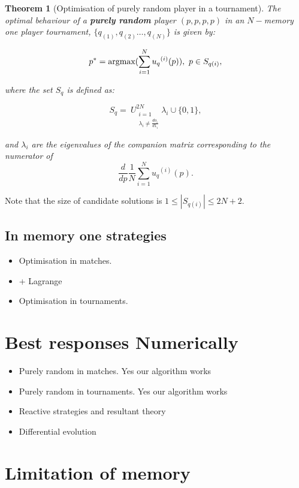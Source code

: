 \documentclass[10pt]{article}
\newtheorem{theorem}{Theorem}
\begin{document}
\begin{theorem}[Optimisation of purely random player in a tournament]
\label{theorem:random_optimisation_tournament}
    The optimal behaviour of a \textbf{purely random} player \((p, p, p, p)\)
    in an \(N-\)memory one player tournament, \(\{q_{(1)}, q_{(2)} \dots,q_{(N)} \}
    \) is given by:

    \[p^* = \textnormal{argmax}(\sum_{i=1} ^ {N} {u_q}^{(i)} (p) ), \ p \in S_{q(i)},\]

    where the set \(S_{q}\) is defined as:

    \[S_{q} = \
    U_{\substack{i=1 \\ \lambda_i \neq \frac{do_i}{d1_i}}} ^ {2N}  \lambda_i \cup \{0, 1\},\]

    and \(\lambda_i\) are the eigenvalues of the companion matrix corresponding to the
    numerator of \[\frac{d}{dp} \frac{1}{N} \sum_{i=1} ^ {N} {u_q}^{(i)} (p).\]
\end{theorem}

Note that the size of candidate solutions is \( 1 \leq|S_{q(i)}| \leq 2N + 2\).

\subsection{In memory one strategies}

\begin{itemize}
    \item Optimisation in matches.
    \item + Lagrange
    \item Optimisation in tournaments.
\end{itemize}

\section{Best responses Numerically}

\begin{itemize}
    \item Purely random in matches. Yes our algorithm works
    \item Purely random in tournaments. Yes our algorithm works
    \item Reactive strategies and resultant theory
    \item Differential evolution
\end{itemize}

\section{Limitation of memory}
\end{document}
